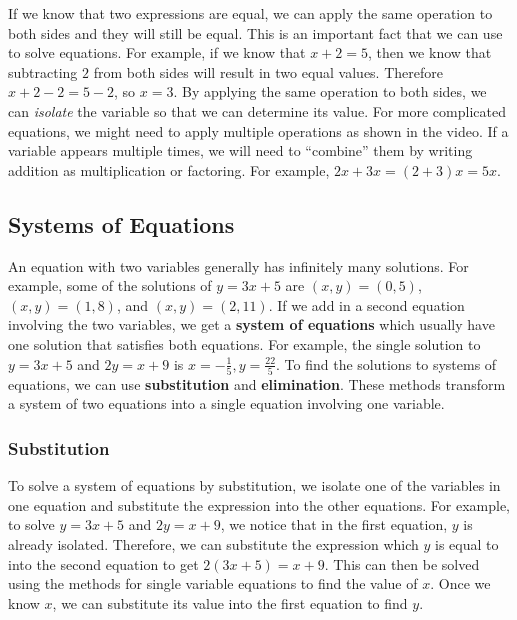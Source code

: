 \documentclass{article}
\begin{document}
    If we know that two expressions are equal, we can apply the same operation
    to both sides and they will still be equal. This is an important fact that
    we can use to solve equations. For example, if we know that $x + 2 = 5$,
    then we know that subtracting $2$ from both sides will result in two equal
    values. Therefore $x + 2 - 2 = 5 - 2$, so $x = 3$. By applying the same
    operation to both sides, we can \emph{isolate} the variable so that we can
    determine its value. For more complicated equations, we might need to apply
    multiple operations as shown in the video. If a variable appears multiple
    times, we will need to ``combine'' them by writing addition as
    multiplication or factoring. For example, $2x + 3x = (2 + 3)x = 5x$.
    \subsection*{Systems of Equations}
    An equation with two variables generally has infinitely many solutions. For
    example, some of the solutions of $y = 3x + 5$ are $(x, y) = (0, 5)$, $(x,
    y) = (1, 8)$, and $(x, y) = (2, 11)$. If we add in a second equation
    involving the two variables, we get a \textbf{system of equations} which
    usually have one solution that satisfies both equations. For example, the
    single solution to $y = 3x + 5$ and $2y = x + 9$ is $x = -\frac{1}{5}, y =
    \frac{22}{5}$. To find the solutions to systems of equations, we can use
    \textbf{substitution} and \textbf{elimination}. These methods transform a
    system of two equations into a single equation involving one variable.
    \subsubsection*{Substitution}
    To solve a system of equations by substitution, we isolate one of the
    variables in one equation and substitute the expression into the other
    equations. For example, to solve $y = 3x + 5$ and $2y = x + 9$, we notice
    that in the first equation, $y$ is already isolated. Therefore, we can
    substitute the expression which $y$ is equal to into the second equation to
    get $2(3x + 5) = x + 9$. This can then be solved using the methods for
    single variable equations to find the value of $x$. Once we know $x$, we can
    substitute its value into the first equation to find $y$.
\end{document}
